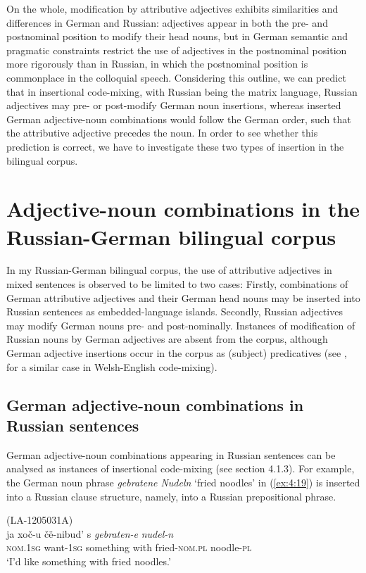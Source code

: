 On the whole, modification by attributive adjectives exhibits similarities and differences in German and Russian: adjectives appear in both the pre- and postnominal position to modify their head nouns, but in German semantic and pragmatic constraints restrict the use of adjectives in the postnominal position more rigorously than in Russian, in which the postnominal position is commonplace in the colloquial speech. Considering this outline, we can predict that in insertional code-mixing, with Russian being the matrix language, Russian adjectives may pre- or post-modify German noun insertions, whereas inserted German adjective-noun combinations would follow the German order, such that the attributive adjective precedes the noun. In order to see whether this prediction is correct, we have to investigate these two types of insertion in the bilingual corpus.

\section{Adjective-noun combinations in the Russian-German bilingual corpus}
In my Russian-German bilingual corpus, the use of attributive adjectives in mixed sentences is observed to be limited to two cases: Firstly, combinations of German attributive adjectives and their German head nouns may be inserted into Russian sentences as embedded-language islands. Secondly, Russian adjectives may modify German nouns pre- and post-nominally. Instances of modification of Russian nouns by German adjectives are absent from the corpus, although German adjective insertions occur in the corpus as (subject) predicatives (see \citealt{deuchar-congruence-2005}, for a similar case in Welsh-English code-mixing).

\subsection{German adjective-noun combinations in Russian sentences}
German adjective-noun combinations appearing in Russian sentences can be analysed as instances of insertional code-mixing (see section 4.1.3). For example, the German noun phrase \textit{gebratene Nudeln} `fried noodles' in (\ref{ex:4:19}) is inserted into a Russian clause structure, namely, into a Russian prepositional phrase. 

\ea
\label{ex:4:19}
(LA-1205031A)\\
\gll ja xoč-u čë-nibud' s \textit{gebraten-e} \textit{nudel-n}\\ 
 \textsc{nom.1sg} want-\textsc{1sg} something with fried-\textsc{nom.pl} noodle-\textsc{pl}\\
\glt `I'd like something with fried noodles.'


